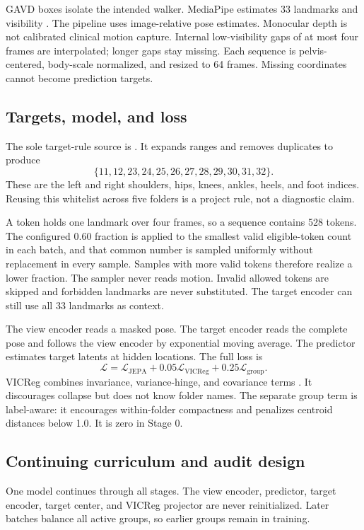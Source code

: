 \documentclass[conference]{IEEEtran}
\begin{document}
GAVD boxes isolate the intended walker. MediaPipe estimates 33 landmarks and visibility \cite{grishchenko2022blazepose,mediapipePoseLandmarker}. The pipeline uses image-relative pose estimates. Monocular depth is not calibrated clinical motion capture. Internal low-visibility gaps of at most four frames are interpolated; longer gaps stay missing. Each sequence is pelvis-centered, body-scale normalized, and resized to 64 frames. Missing coordinates cannot become prediction targets.

\subsection{Targets, model, and loss}
The sole target-rule source is . It expands ranges and removes duplicates to produce
\begin{equation}
\{11,12,23,24,25,26,27,28,29,30,31,32\}.
\end{equation}
These are the left and right shoulders, hips, knees, ankles, heels, and foot indices. Reusing this whitelist across five folders is a project rule, not a diagnostic claim.

A token holds one landmark over four frames, so a sequence contains 528 tokens. The configured 0.60 fraction is applied to the smallest valid eligible-token count in each batch, and that common number is sampled uniformly without replacement in every sample. Samples with more valid tokens therefore realize a lower fraction. The sampler never reads motion. Invalid allowed tokens are skipped and forbidden landmarks are never substituted. The target encoder can still use all 33 landmarks as context.

The view encoder reads a masked pose. The target encoder reads the complete pose and follows the view encoder by exponential moving average. The predictor estimates target latents at hidden locations. The full loss is
\begin{equation}
\mathcal L=\mathcal L_{\mathrm{JEPA}}+0.05\mathcal L_{\mathrm{VICReg}}+0.25\mathcal L_{\mathrm{group}}.
\end{equation}
VICReg combines invariance, variance-hinge, and covariance terms \cite{bardes2022vicreg}. It discourages collapse but does not know folder names. The separate group term is label-aware: it encourages within-folder compactness and penalizes centroid distances below 1.0. It is zero in Stage 0.

\subsection{Continuing curriculum and audit design}
One model continues through all stages. The view encoder, predictor, target encoder, target center, and VICReg projector are never reinitialized. Later batches balance all active groups, so earlier groups remain in training.
\end{document}
